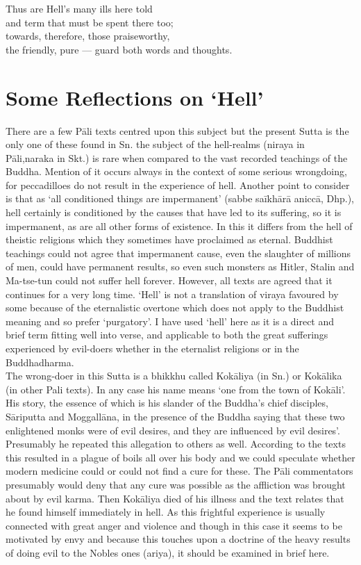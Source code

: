 \begin{MyDescription}{}
Thus are Hell's many ills here told\\
and term that must be spent there too;\\
towards, therefore, those praiseworthy,\\
the friendly, pure — guard both words and thoughts.
\end{MyDescription} 
   

\section{Some Reflections on `Hell'}
There are a few P\=ali texts centred upon this subject but the present Sutta is the only one of these found in Sn. the subject of the hell-realms (niraya in P\=ali,naraka in Skt.) is rare when compared to the vast recorded teachings of the Buddha. Mention of it occurs always in the context of some serious wrongdoing, for peccadilloes do not result in the experience of hell. Another point to consider is that as `all conditioned things are impermanent' (sabbe sa\=ikh\=ar\=a anicc\=a, Dhp.), hell certainly is conditioned by the causes that have led to its suffering, so it is impermanent, as are all other forms of existence. In this it differs from the hell of theistic religions which they sometimes have proclaimed as eternal. Buddhist teachings could not agree that impermanent cause, even the slaughter of millions of men, could have permanent results, so even such monsters as Hitler, Stalin and Ma-tse-tun could not suffer hell forever. However, all texts are agreed that it continues for a very long time. `Hell' is not a translation of viraya favoured by some because of the eternalistic overtone which does not apply to the Buddhist meaning and so prefer `purgatory'. I have used `hell' here as it is a direct and brief term fitting well into verse, and applicable to both the great sufferings experienced by evil-doers whether in the eternalist religions or in the Buddhadharma.\\

The wrong-doer in this Sutta is a bhikkhu called Kok\=aliya (in Sn.) or Kok\=alika (in other Pali texts). In any case his name means `one from the town of Kok\=ali'. His story, the essence of which is his slander of the Buddha's chief disciples, S\=ariputta and Moggall\=ana, in the presence of the Buddha saying that these two enlightened monks were of evil desires, and they are influenced by evil desires'. Presumably he repeated this allegation to others as well. According to the texts this resulted in a plague of boils all over his body and we could speculate whether modern medicine could or could not find a cure for these. The P\=ali commentators presumably would deny that any cure was possible as the affliction was brought about by evil karma. Then Kok\=aliya died of his illness and the text relates that he found himself immediately in hell. As this frightful experience is usually connected with great anger and violence and though in this case it seems to be motivated by envy and because this touches upon a doctrine of the heavy results of doing evil to the Nobles ones (ariya), it should be examined in brief here.\\

